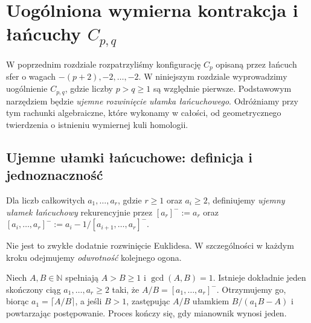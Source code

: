 \chapter{Uogólniona wymierna kontrakcja i łańcuchy \texorpdfstring{$C_{p,q}$}{Cpq}}
\label{ch:tg-rb-general}

W poprzednim rozdziale rozpatrzyliśmy konfigurację $C_p$ opisaną przez
łańcuch sfer o wagach $-(p+2),-2,\ldots,-2$. W niniejszym
rozdziale wyprowadzimy uogólnienie $C_{p,q}$, gdzie liczby $p>q\geq1$
są względnie pierwsze. Podstawowym narzędziem będzie \emph{ujemne
rozwinięcie ułamka łańcuchowego}. Odróżniamy przy tym rachunki
algebraiczne, które wykonamy w całości, od geometrycznego twierdzenia
o istnieniu wymiernej kuli homologii.

\section{Ujemne ułamki łańcuchowe: definicja i jednoznaczność}
\label{sec:tg-general-cf}

\begin{definicja}
Dla liczb całkowitych $a_1,\ldots,a_r$, gdzie $r\geq1$ oraz
$a_i\geq2$, definiujemy \emph{ujemny ułamek łańcuchowy}
rekurencyjnie przez $[a_r]^-:=a_r$ oraz
$[a_i,\ldots,a_r]^-:=a_i-1/[a_{i+1},\ldots,a_r]^-$.
\end{definicja}

Nie jest to zwykłe dodatnie rozwinięcie Euklidesa. W szczególności
w każdym kroku odejmujemy \emph{odwrotność} kolejnego ogona.

\begin{twierdzenie}
\label{thm:tg-cf-algorithm}
Niech $A,B\in\mathbb N$ spełniają $A>B\geq1$ i
$\gcd(A,B)=1$. Istnieje dokładnie jeden skończony ciąg
$a_1,\ldots,a_r\geq2$ taki, że $A/B=[a_1,\ldots,a_r]^-$. 
Otrzymujemy go, biorąc $a_1=\lceil A/B\rceil$, a jeśli
$B>1$, zastępując $A/B$ ułamkiem $B/(a_1B-A)$ i powtarzając
postępowanie. Proces kończy się, gdy mianownik wynosi jeden.
\end{twierdzenie}

